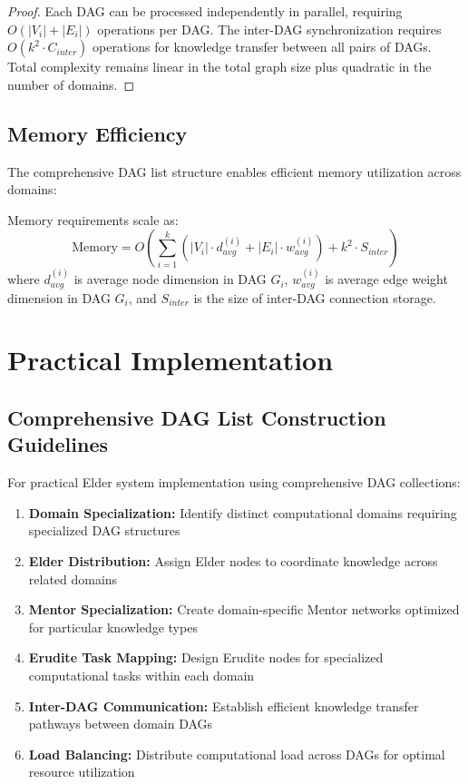 \begin{proof}
Each DAG can be processed independently in parallel, requiring $O(|V_i| + |E_i|)$ operations per DAG. The inter-DAG synchronization requires $O(k^2 \cdot C_{inter})$ operations for knowledge transfer between all pairs of DAGs. Total complexity remains linear in the total graph size plus quadratic in the number of domains.
\end{proof}

\subsection{Memory Efficiency}

The comprehensive DAG list structure enables efficient memory utilization across domains:

\begin{lemma}
Memory requirements scale as:
\begin{equation}
\text{Memory} = O\left(\sum_{i=1}^k (|V_i| \cdot d_{avg}^{(i)} + |E_i| \cdot w_{avg}^{(i)}) + k^2 \cdot S_{inter}\right)
\end{equation}
where $d_{avg}^{(i)}$ is average node dimension in DAG $G_i$, $w_{avg}^{(i)}$ is average edge weight dimension in DAG $G_i$, and $S_{inter}$ is the size of inter-DAG connection storage.
\end{lemma}

\section{Practical Implementation}

\subsection{Comprehensive DAG List Construction Guidelines}

For practical Elder system implementation using comprehensive DAG collections:

\begin{enumerate}
    \item \textbf{Domain Specialization:} Identify distinct computational domains requiring specialized DAG structures
    \item \textbf{Elder Distribution:} Assign Elder nodes to coordinate knowledge across related domains
    \item \textbf{Mentor Specialization:} Create domain-specific Mentor networks optimized for particular knowledge types
    \item \textbf{Erudite Task Mapping:} Design Erudite nodes for specialized computational tasks within each domain
    \item \textbf{Inter-DAG Communication:} Establish efficient knowledge transfer pathways between domain DAGs
    \item \textbf{Load Balancing:} Distribute computational load across DAGs for optimal resource utilization
\end{enumerate}

